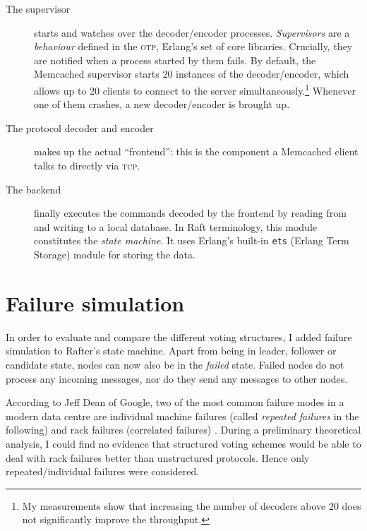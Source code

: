 \documentclass[12pt,chapterprefix=true,toc=bibliography,numbers=noendperiod,
               footnotes=multiple,twoside]{scrreprt}
\newcommand{\ECC}[0]{\textsc{ec}2}
\begin{document}
\begin{description}
    \item[The supervisor] starts and watches over the decoder/encoder processes. \emph{Supervisors} are a \emph{behaviour} defined in the \textsc{otp}, Erlang's set of core libraries. Crucially, they are notified when a process started by them fails. By default, the Memcached supervisor starts 20 instances of the decoder/encoder, which allows up to 20 clients to connect to the server simultaneously.\footnote{My measurements show that increasing the number of decoders above 20 does not significantly improve the throughput.} Whenever one of them crashes, a new decoder/encoder is brought up.
    \item[The protocol decoder and encoder] makes up the actual \enquote{frontend}: this is the component a Memcached client talks to directly via \textsc{tcp}.
    \item[The backend] finally executes the commands decoded by the frontend by reading from and writing to a local database. In Raft terminology, this module constitutes the \emph{state machine}. It uses Erlang's built-in \texttt{ets} (Erlang Term Storage) module for storing the data.
\end{description}

\section{Failure simulation}
\label{sc:failure-simulation}

In order to evaluate and compare the different voting structures, I added failure simulation to Rafter's state machine. Apart from being in leader, follower or candidate state, nodes can now also be in the \textit{failed} state. Failed nodes do not process any incoming messages, nor do they send any messages to other nodes.

According to Jeff Dean of Google, two of the most common failure modes in a modern data centre are individual machine failures (called \emph{repeated failures} in the following) and rack failures (correlated failures) \autocite[sl. 10]{distr}. During a preliminary theoretical analysis, I could find no evidence that structured voting schemes would be able to deal with rack failures better than unstructured protocols. Hence only repeated/individual failures were considered.

\end{document}
